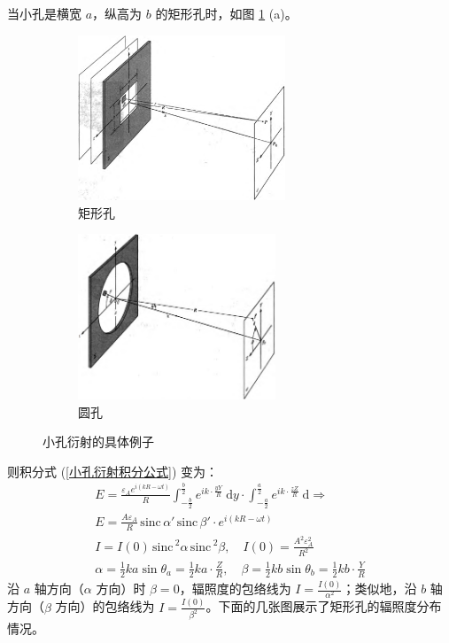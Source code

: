 \documentclass[UTF8]{report}
\def\sinc{\mathrm{\,sinc}\,}
\theoremstyle{MyLineTheoremStyle} %
\theoremstyle{MyBlockTheoremStyle} %
\theoremstyle{MySubsubsectionStyle} %
\begin{document}
当小孔是横宽 $a$，纵高为 $b$ 的矩形孔时，如图 \ref{小孔衍射的具体例子} (a)。
\begin{figure}[H]\centering
    \begin{subfigure}[b]{0.5\columnwidth}\centering
        \includegraphics[height=140pt]{assets/4/4.3 矩形孔.png}
        \caption{矩形孔}
    \end{subfigure}\hfill
    \begin{subfigure}[b]{0.5\columnwidth}\centering
        \includegraphics[height=140pt]{assets/4/4.3 圆孔.png}
        \caption{圆孔}
    \end{subfigure}
    \caption{小孔衍射的具体例子}
    \label{小孔衍射的具体例子}
\end{figure}
则积分式 (\ref{小孔衍射积分公式}) 变为：
\begin{gather}
    E = \frac{\varepsilon_{A} e^{i(kR - \omega t)}}{R} \int_{-\frac{b}{2}}^{\frac{b}{2}} e^{ik \cdot \frac{yY}{R}}\ \mathrm{d}y \cdot \int_{-\frac{a}{2}}^{\frac{a}{2}} e^{ik \cdot \frac{zZ}{R}}\ \mathrm{d} \Longrightarrow \\ 
    E = \frac{A\varepsilon_A}{R} \sinc \alpha' \sinc \beta' \cdot e^{i(kR - \omega t)}
    \\ 
    I = I(0)\sinc^2 \alpha \sinc^2 \beta,\quad I(0) = \frac{A^2\varepsilon_A^2}{R^2} 
    \\ 
    \alpha = \frac{1}{2}ka \sin \theta_a = \frac{1}{2}ka\cdot \frac{Z}{R},\quad \beta = \frac{1}{2}kb \sin \theta_b = \frac{1}{2}kb\cdot \frac{Y}{R}
\end{gather}
沿 $a$ 轴方向（$\alpha$ 方向）时 $\beta = 0$，辐照度的包络线为 $I = \frac{I(0)}{\alpha^2}$；类似地，沿 $b$ 轴方向（$\beta$ 方向）的包络线为 $I = \frac{I(0)}{\beta^2}$。下面的几张图展示了矩形孔的辐照度分布情况。
\end{document}
